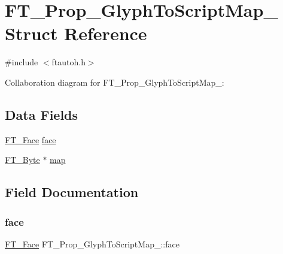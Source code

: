 \hypertarget{struct_f_t___prop___glyph_to_script_map__}{}\section{F\+T\+\_\+\+Prop\+\_\+\+Glyph\+To\+Script\+Map\+\_\+ Struct Reference}
\label{struct_f_t___prop___glyph_to_script_map__}


{\ttfamily \#include $<$ftautoh.\+h$>$}



Collaboration diagram for F\+T\+\_\+\+Prop\+\_\+\+Glyph\+To\+Script\+Map\+\_\+\+:
\subsection*{Data Fields}
\begin{DoxyCompactItemize}
\item 
\hyperlink{freetype_8h_a7eba045ee20968354fa1bff0f69740fa}{F\+T\+\_\+\+Face} \hyperlink{struct_f_t___prop___glyph_to_script_map___a08fa6630173f5351bf5bf8e54ab0adcf}{face}
\item 
\hyperlink{fttypes_8h_a51f26183ca0c9f4af958939648caeccd}{F\+T\+\_\+\+Byte} $\ast$ \hyperlink{struct_f_t___prop___glyph_to_script_map___a67a7d033eb544d8197578549dca4c894}{map}
\end{DoxyCompactItemize}


\subsection{Field Documentation}
\mbox{\label{struct_f_t___prop___glyph_to_script_map___a08fa6630173f5351bf5bf8e54ab0adcf}} 
\subsubsection{\texorpdfstring{face}{face}}
{\footnotesize\ttfamily \hyperlink{freetype_8h_a7eba045ee20968354fa1bff0f69740fa}{F\+T\+\_\+\+Face} F\+T\+\_\+\+Prop\+\_\+\+Glyph\+To\+Script\+Map\+\_\+\+::face}

\mbox{\label{struct_f_t___prop___glyph_to_script_map___a67a7d033eb544d8197578549dca4c894}} 
